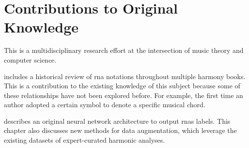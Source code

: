 \chapter*{Contributions to Original Knowledge}
\label{chap:contributionstoknowledge}

This \thesisdiss{} is a multidisciplinary research effort at
the intersection of music theory and computer science.

 includes a
historical review of \gls{rna} notations throughout multiple
harmony books. This is a contribution to the existing
knowledge of this subject because some of these
relationships have not been explored before. For example,
the first time an author adopted a certain symbol to denote
a specific musical chord. 

 describes an original neural network
architecture to output \glspl{rna} labels. This chapter also
discusses new methods for data augmentation, which leverage
the existing datasets of expert-curated harmonic analyses.